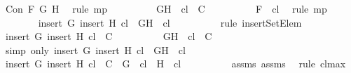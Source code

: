 \begin{isabellebody}
\ {\isacartoucheopen}Con\ F\ G\ H{\isacartoucheclose}\ \isamarkupfalse%
\ {\isacharparenleft}rule\ mp{\isacharparenright}\isanewline
\ \ \ \ \ \ \isamarkupfalse%
\ \isamarkupfalse%
\ {\isachardoublequoteopen}{\isacharbraceleft}G{\isacharcomma}H{\isacharbraceright}\ {\isasymunion}\ {\isacharquery}cl\ {\isasymin}\ C{\isachardoublequoteclose}\isanewline
\ \ \ \ \ \ \ \ \isamarkupfalse%
\ {\isacartoucheopen}F\ {\isasymin}\ {\isacharquery}cl{\isacartoucheclose}\ \isamarkupfalse%
\ {\isacharparenleft}rule\ mp{\isacharparenright}\isanewline
\ \ \ \ \ \ \isamarkupfalse%
\ {\isachardoublequoteopen}{\isacharparenleft}insert\ G\ {\isacharparenleft}insert\ H\ {\isacharquery}cl{\isacharparenright}{\isacharparenright}\ {\isacharequal}\ {\isacharbraceleft}G{\isacharcomma}H{\isacharbraceright}\ {\isasymunion}\ {\isacharquery}cl{\isachardoublequoteclose}\isanewline
\ \ \ \ \ \ \ \ \isamarkupfalse%
\ {\isacharparenleft}rule\ insertSetElem{\isacharparenright}\isanewline
\ \ \ \ \ \ \isamarkupfalse%
\ \isamarkupfalse%
\ {\isachardoublequoteopen}{\isacharparenleft}insert\ G\ {\isacharparenleft}insert\ H\ {\isacharquery}cl{\isacharparenright}{\isacharparenright}\ {\isasymin}\ C{\isachardoublequoteclose}\isanewline
\ \ \ \ \ \ \ \ \isamarkupfalse%
\ {\isacartoucheopen}{\isacharbraceleft}G{\isacharcomma}H{\isacharbraceright}\ {\isasymunion}\ {\isacharquery}cl\ {\isasymin}\ C{\isacartoucheclose}\ \isamarkupfalse%
\ {\isacharparenleft}simp\ only{\isacharcolon}\ {\isacartoucheopen}{\isacharparenleft}insert\ G\ {\isacharparenleft}insert\ H\ {\isacharquery}cl{\isacharparenright}{\isacharparenright}\ {\isacharequal}\ {\isacharbraceleft}G{\isacharcomma}H{\isacharbraceright}\ {\isasymunion}\ {\isacharquery}cl{\isacartoucheclose}{\isacharparenright}\isanewline
\ \ \ \ \ \ \isamarkupfalse%
\ {\isachardoublequoteopen}{\isacharparenleft}insert\ G\ {\isacharparenleft}insert\ H\ {\isacharquery}cl{\isacharparenright}{\isacharparenright}\ {\isasymin}\ C\ {\isasymLongrightarrow}\ G\ {\isasymin}\ {\isacharquery}cl\ {\isasymand}\ H\ {\isasymin}\ {\isacharquery}cl{\isachardoublequoteclose}\isanewline
\ \ \ \ \ \ \ \ \isamarkupfalse%
\ assms{\isacharparenleft}{}{\isacharparenright}\ assms{\isacharparenleft}{}{\isacharparenright}\ \isamarkupfalse%
\ {\isacharparenleft}rule\ cl{\isacharunderscore}max{\isacharprime}{\isacharparenright}\isanewline
\ \ \ \ \ \ \isamarkupfalse%

\end{isabellebody}
